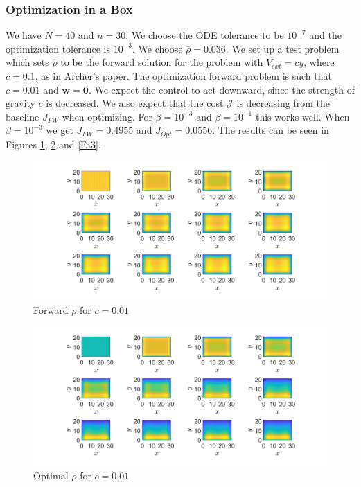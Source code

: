 \documentclass[11pt, a4paper]{article}
\theoremstyle{definition}
\newcommand{\w}{\mathbf{w}}
\newcommand{\hr}{\widehat \rho}
\begin{document}
\subsubsection{Optimization in a Box}
We have $N = 40$ and $n = 30$. We choose the ODE tolerance to be $10^{-7}$ and the optimization tolerance is $10^{-3}$. We choose $\bar \rho = 0.036$.
We set up a test problem which sets $\hr$ to be the forward solution for the problem with $V_{ext} = cy$, where $c = 0.1$, as in Archer's paper. The optimization forward problem is such that $c = 0.01$ and $\w = \mathbf 0$. We expect the control to act downward, since the strength of gravity $c$ is decreased.
We also expect that the cost $\mathcal J$ is decreasing from the baseline $J_{FW}$ when optimizing.
For $\beta = 10^{-3}$ and $\beta = 10^{-1}$ this works well.
When $\beta = 10^{-3}$ we get $J_{FW} = 0.4955$ and $J_{Opt} = 0.0556 $. 
The results can be seen in Figures \ref{Fa1}, \ref{Fa2} and \ref{Fa3}.
\begin{figure}[h]
	\centering
	\includegraphics[scale=0.35]{F11.png}
	\caption{Forward $\rho$ for $c = 0.01$} 
	\label{Fa1}
\end{figure}	
\begin{figure}[h]
	\centering
	\includegraphics[scale=0.35]{F21.png}
	\caption{Optimal $\rho$ for $c = 0.01$} 
	\label{Fa2}
\end{figure}
\end{document}

